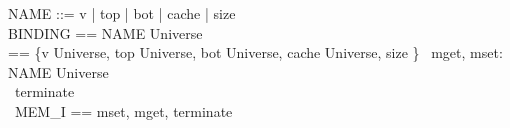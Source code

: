 \begin{circus}
	[Universe]
	\also NAME ::= v | top | bot | cache | size \\
    \also BINDING == NAME \fun Universe \\
    \also \delta == \{v \mapsto Universe, top \mapsto Universe, bot \mapsto Universe, cache \mapsto Universe, size \mapsto \nat \}
    \also \circchannel\ mget, mset: NAME \cross Universe \\
    \also \circchannel\ terminate \\
    \also \circchannelset\ MEM\_I == \lchanset mset, mget, terminate \rchanset \\
\end{circus}




